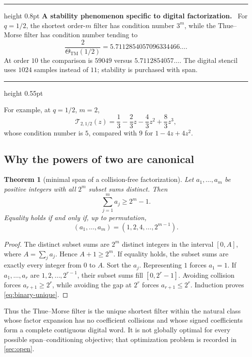 \documentclass[11pt,oneside]{article}
\numberwithin{equation}{section}
\newtheorem{theorem}{Theorem}[section]
\theoremstyle{definition}
\theoremstyle{remark}
\newcommand{\ThetaTM}{\Theta_{\!\mathrm{TM}}}
\newenvironment{resultbox}[1]{%
  \par\medskip\noindent\begin{center}\begin{minipage}{0.94\textwidth}%
  \color{Teal}\hrule height 0.8pt\vspace{0.6em}%
  \color{black}\textbf{\color{Teal}#1.}\ }{%
  \par\vspace{0.6em}\color{Teal}\hrule height 0.55pt
  \end{minipage}\end{center}\medskip}
\begin{document}
\begin{resultbox}{A stability phenomenon specific to digital factorization}
For $q=1/2$, the shortest order-$m$ filter has condition number $3^m$, while the
Thue--Morse filter has condition number tending to
\[
 \frac{2}{\ThetaTM(1/2)}
 =5.7112854057096334466\ldots.
\]
At order $10$ the comparison is $59049$ versus $5.7112854057\ldots$.  The digital
stencil uses $1024$ samples instead of $11$; stability is purchased with span.
\end{resultbox}

For example, at $q=1/2$, $m=2$,
\begin{equation}
 \mathcal T_{2,1/2}(z)
 =\frac13-\frac23z-\frac43z^2+\frac83z^3,
 \label{eq:tm-order2}
\end{equation}
whose condition number is $5$, compared with $9$ for $1-4z+4z^2$.

\subsection{Why the powers of two are canonical}

\begin{theorem}[minimal span of a collision-free factorization]
\label{thm:minimal-binary-span}
Let $a_1,\ldots,a_m$ be positive integers with all $2^m$ subset sums distinct.  Then
\begin{equation}
 \sum_{j=1}^{m}a_j\ge2^m-1.
 \label{eq:subset-span-bound}
\end{equation}
Equality holds if and only if, up to permutation,
\begin{equation}
 (a_1,\ldots,a_m)=(1,2,4,\ldots,2^{m-1}).
 \label{eq:binary-unique}
\end{equation}
\end{theorem}

\begin{proof}
The distinct subset sums are $2^m$ distinct integers in the interval
$[0,A]$, where $A=\sum_ja_j$.  Hence $A+1\ge2^m$.  If equality holds, the subset
sums are exactly every integer from $0$ to $A$.  Sort the $a_j$.  Representing $1$
forces $a_1=1$.  If $a_1,\ldots,a_r$ are $1,2,\ldots,2^{r-1}$, their subset sums fill
$[0,2^r-1]$.  Avoiding collision forces $a_{r+1}\ge2^r$, while avoiding the gap at
$2^r$ forces $a_{r+1}\le2^r$.  Induction proves \eqref{eq:binary-unique}.
\end{proof}

Thus the Thue--Morse filter is the unique shortest filter within the natural class whose
factor expansion has no coefficient collisions and whose signed coefficients form a
complete contiguous digital word.  It is not globally optimal for every possible
span--conditioning objective; that optimization problem is recorded in
\cref{sec:open}.
\end{document}
